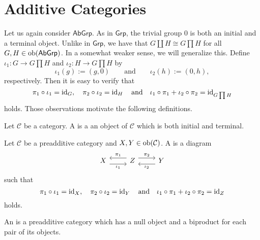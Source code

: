 \section{Additive Categories}
Let us again consider $\mathsf{AbGrp}$. As in $\mathsf{Grp}$, the trivial group $0$ is both an initial and a terminal object. Unlike in $\mathsf{Grp}$, we have that $G \coprod H \cong G \prod H$ for all $G,H \in \operatorname{ob}(\mathsf{AbGrp})$. In a somewhat weaker sense, we will generalize this. Define $\iota_1 : G \to G \prod H$ and $\iota_2 : H \to G \prod H$ by
\begin{equation*}
	\iota_1(g) := (g,0) \qquad \text{and} \qquad \iota_2(h) := (0,h),
\end{equation*}
\noindent respectively. Then it is easy to verify that 
\begin{equation*}
	\pi_1\circ\iota_1 = \operatorname{id}_G, \quad \pi_2\circ\iota_2 = \operatorname{id}_H \quad \text{and} \quad \iota_1 \circ \pi_1 + \iota_2 \circ \pi_2 = \operatorname{id}_{G \prod H}
\end{equation*}
\noindent holds. Those observations motivate the following definitions.

\begin{definition}
	Let $\mathcal{C}$ be a category. A  is a an object of $\mathcal{C}$ which is both initial and terminal.
\end{definition}

\begin{definition}
	Let $\mathcal{C}$ be a preadditive category and $X,Y \in \operatorname{ob}(\mathcal{C})$. A  is a diagram
	\begin{equation*}
		\begin{tikzcd}
			X \arrow[r, shift right = 1ex, "\iota_1"'] & Z \arrow[r,shift left = 1ex, "\pi_2"]\arrow[l,shift right = 1ex,"\pi_1"'] & Y \arrow[l,shift left = 1ex,"\iota_2"] 
		\end{tikzcd}
	\end{equation*}
	\noindent such that
	\begin{equation*}
		\pi_1\circ\iota_1 = \operatorname{id}_X, \quad \pi_2\circ\iota_2 = \operatorname{id}_Y \quad \text{and} \quad \iota_1 \circ \pi_1 + \iota_2 \circ \pi_2 = \operatorname{id}_Z
	\end{equation*}
	\noindent holds.
\end{definition}

\begin{definition}
	An  is a preadditive category which has a null object and a biproduct for each pair of its objects.	
\end{definition}

